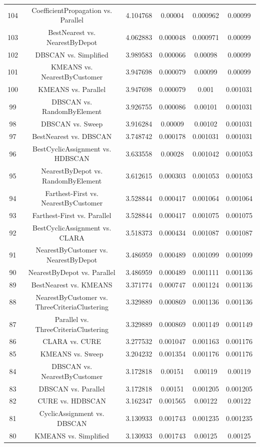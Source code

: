 \documentclass[a4paper,10pt]{article}
\begin{document}
\begin{landscape}
\begin{table}[!htp]
\begin{tabular}{cccccc}
104&CoefficientPropagation vs. Parallel&4.104768&0.00004&0.000962&0.00099\\
103&BestNearest vs. NearestByDepot&4.062883&0.000048&0.000971&0.00099\\
102&DBSCAN vs. Simplified&3.989583&0.000066&0.00098&0.00099\\
101&KMEANS vs. NearestByCustomer&3.947698&0.000079&0.00099&0.00099\\
100&KMEANS vs. Parallel&3.947698&0.000079&0.001&0.001031\\
99&DBSCAN vs. RandomByElement&3.926755&0.000086&0.00101&0.001031\\
98&DBSCAN vs. Sweep&3.916284&0.00009&0.00102&0.001031\\
97&BestNearest vs. DBSCAN&3.748742&0.000178&0.001031&0.001031\\
96&BestCyclicAssignment vs. HDBSCAN&3.633558&0.00028&0.001042&0.001053\\
95&NearestByDepot vs. RandomByElement&3.612615&0.000303&0.001053&0.001053\\
94&Farthest-First vs. NearestByCustomer&3.528844&0.000417&0.001064&0.001064\\
93&Farthest-First vs. Parallel&3.528844&0.000417&0.001075&0.001075\\
92&BestCyclicAssignment vs. CLARA&3.518373&0.000434&0.001087&0.001087\\
91&NearestByCustomer vs. NearestByDepot&3.486959&0.000489&0.001099&0.001099\\
90&NearestByDepot vs. Parallel&3.486959&0.000489&0.001111&0.001136\\
89&BestNearest vs. KMEANS&3.371774&0.000747&0.001124&0.001136\\
88&NearestByCustomer vs. ThreeCriteriaClustering&3.329889&0.000869&0.001136&0.001136\\
87&Parallel vs. ThreeCriteriaClustering&3.329889&0.000869&0.001149&0.001149\\
86&CLARA vs. CURE&3.277532&0.001047&0.001163&0.001176\\
85&KMEANS vs. Sweep&3.204232&0.001354&0.001176&0.001176\\
84&DBSCAN vs. NearestByCustomer&3.172818&0.00151&0.00119&0.00119\\
83&DBSCAN vs. Parallel&3.172818&0.00151&0.001205&0.001205\\
82&CURE vs. HDBSCAN&3.162347&0.001565&0.00122&0.00122\\
81&CyclicAssignment vs. DBSCAN&3.130933&0.001743&0.001235&0.001235\\
80&KMEANS vs. Simplified&3.130933&0.001743&0.00125&0.00125\\

\end{tabular}
\end{table}
\end{landscape}
\end{document}
